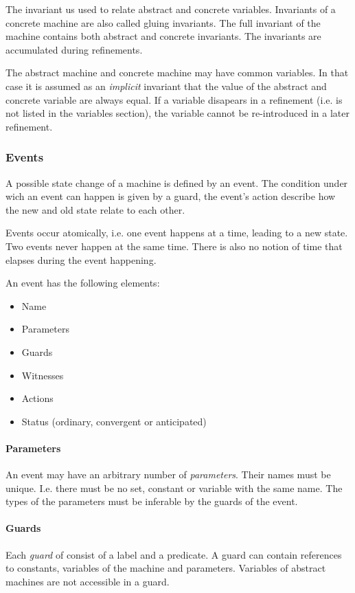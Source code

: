 The invariant us used to relate abstract and concrete variables. Invariants of a concrete machine are also called gluing invariants.
The full invariant of the machine contains both abstract and concrete invariants. 
The invariants are accumulated during refinements.

The abstract machine and concrete machine may have common variables.
In that case it is assumed as an \emph{implicit} invariant that the value of the abstract and concrete
variable are always equal. 
If a variable disapears in a refinement (i.e. is not listed in the variables section), the variable cannot
be re-introduced in a later refinement.

\subsubsection{Events}

A possible state change of a machine is defined by an event.
The condition under wich an event can happen is given by a guard, the event's action
describe how the new and old state relate to each other.

Events occur atomically, i.e. one event happens at a time, leading to a new state.
Two events never happen at the same time. There is also no notion of time that elapses
during the event happening.

An event has the following elements:
\begin{itemize}
\item Name
\item Parameters
\item Guards
\item Witnesses
\item Actions
\item Status (ordinary, convergent or anticipated)
\end{itemize}

\paragraph{Parameters}
An event may have an arbitrary number of \emph{parameters}. Their names must be unique. 
I.e. there must be no set, constant or variable with the same name.
The types of the parameters must be inferable by the guards of the event.

\paragraph{Guards}
Each \emph{guard} of consist of a label and a predicate.
A guard can contain references to constants, variables of the machine and parameters.
Variables of abstract machines are not accessible in a guard.

